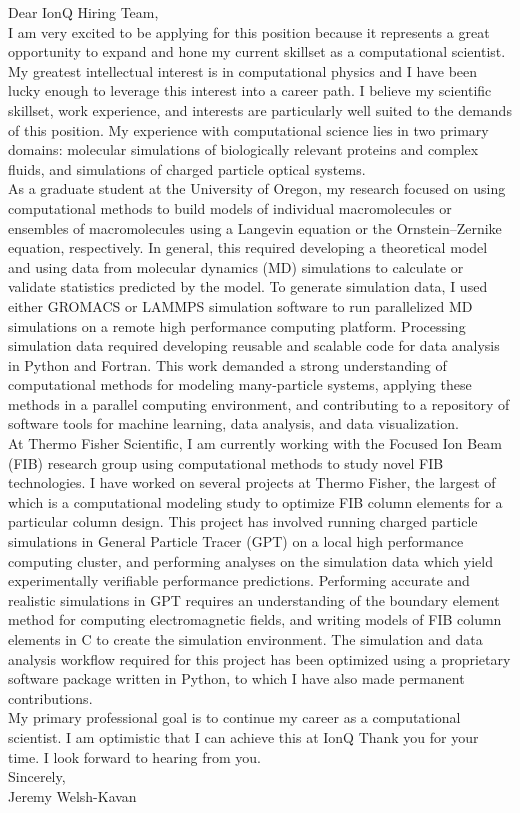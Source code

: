 \documentclass[]{letter}
\begin{document}

Dear IonQ Hiring Team, \\

I am very excited to be applying for this position because it represents a great opportunity to expand and hone my current skillset as a computational scientist. My greatest intellectual interest is in computational physics and I have been lucky enough to leverage this interest into a career path. I believe my scientific skillset, work experience, and interests are particularly well suited to the demands of this position. My experience with computational science lies in two primary domains: molecular simulations of biologically relevant proteins and complex fluids, and simulations of charged particle optical systems. \\

As a graduate student at the University of Oregon, my research focused on using computational methods to build models of individual macromolecules or ensembles of macromolecules using a Langevin equation or the Ornstein–Zernike equation, respectively. In general, this required developing a theoretical model and using data from molecular dynamics (MD) simulations to calculate or validate statistics predicted by the model. To generate simulation data, I used either GROMACS or LAMMPS simulation software to run parallelized MD simulations on a remote high performance computing platform. Processing simulation data required developing reusable and scalable code for data analysis in Python and Fortran. This work demanded a strong understanding of computational methods for modeling many-particle systems, applying these methods in a parallel computing environment, and contributing to a repository of software tools for machine learning, data analysis, and data visualization. \\

At Thermo Fisher Scientific, I am currently working with the Focused Ion Beam (FIB) research group using computational methods to study novel FIB technologies. I have worked on several projects at Thermo Fisher, the largest of which is a computational modeling study to optimize FIB column elements for a particular column design. This project has involved running charged particle simulations in General Particle Tracer (GPT) on a local high performance computing cluster, and performing analyses on the simulation data which yield experimentally verifiable performance predictions. Performing accurate and realistic simulations in GPT requires an understanding of the boundary element method for computing electromagnetic fields, and writing models of FIB column elements in C to create the simulation environment. The simulation and data analysis workflow required for this project has been optimized using a proprietary software package written in Python, to which I have also made permanent contributions. \\

My primary professional goal is to continue my career as a computational scientist. I am optimistic that I can achieve this at IonQ Thank you for your time. I look forward to hearing from you. \\

Sincerely, \\
Jeremy Welsh-Kavan
\end{document}
